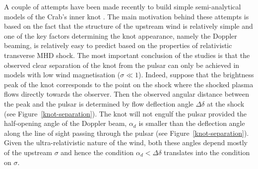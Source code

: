 A couple of attempts have been made recently to build simple semi-analytical models of the Crab’s inner knot \citep{YB-15,LKP-16}. The main motivation behind these attempts is based on the fact that the structure of the upstream wind is relatively simple and one of the key factors determining the knot appearance, namely the Doppler beaming, is relatively easy to predict based on the properties of relativistic transverse MHD shock.  The most important conclusion of the studies is that the observed clear separation of the knot from the pulsar can only be achieved in models with low wind magnetisation ($\sigma \ll 1$).  Indeed, suppose that the brightness peak of the knot corresponds to the point on the shock where the shocked plasma flows directly towards the observer. Then the observed angular distance between the peak and the pulsar is determined by flow deflection angle $\Delta\delta$ at the shock (see Figure~\ref{knot-separation}). The knot will not engulf the pulsar provided the half-opening angle of the Doppler beam, $\alpha_d$ is smaller than the deflection angle along the line of sight passing through the pulsar (see Figure~\ref{knot-separation}). Given the ultra-relativistic nature of the wind, both these angles depend mostly of the upstream $\sigma$ and hence the condition $\alpha_d < \Delta\delta$ translates into the condition on $\sigma$.    